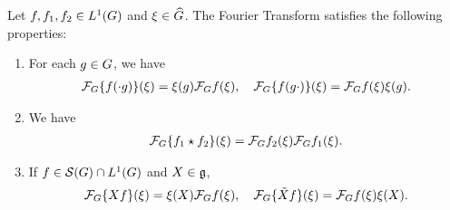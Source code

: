 \begin{proposition}
\label{proposition:elementary_properties_of_the_Fourier_transform}
    Let $f, f_1, f_2 \in {L^{1} (G)}$ and $\xi \in {\widehat{G}}$.
    The Fourier Transform satisfies the following properties:
    \begin{enumerate}
        \item For each $g \in G$, we have
            \begin{align*}
                \mathcal{F}_{G} \{f(\cdot g)\} (\xi)
                = \xi(g) \mathcal{F}_{G} f(\xi), \quad
                \mathcal{F}_{G} \{f(g \cdot)\} (\xi)
                = \mathcal{F}_{G} f(\xi) \xi(g).
            \end{align*}
        \item We have
            \begin{align*}
                \mathcal{F}_{G} \{f_1 \star f_2\}(\xi)
                = \mathcal{F}_{G} f_2(\xi) \mathcal{F}_{G} f_1(\xi).
            \end{align*}
        \item If $f \in {\mathcal{S} (G)} \cap {L^{1} (G)}$ and $X \in \mathfrak{g}$,
            \begin{align*}
                \mathcal{F}_{G} \{{X} f\}(\xi)
                = \xi(X) \mathcal{F}_{G} f(\xi), \quad
                \mathcal{F}_{G} \{\tilde{X} f\}(\xi)
                = \mathcal{F}_{G} f(\xi) \xi(X).
            \end{align*}
    \end{enumerate}
\end{proposition}
